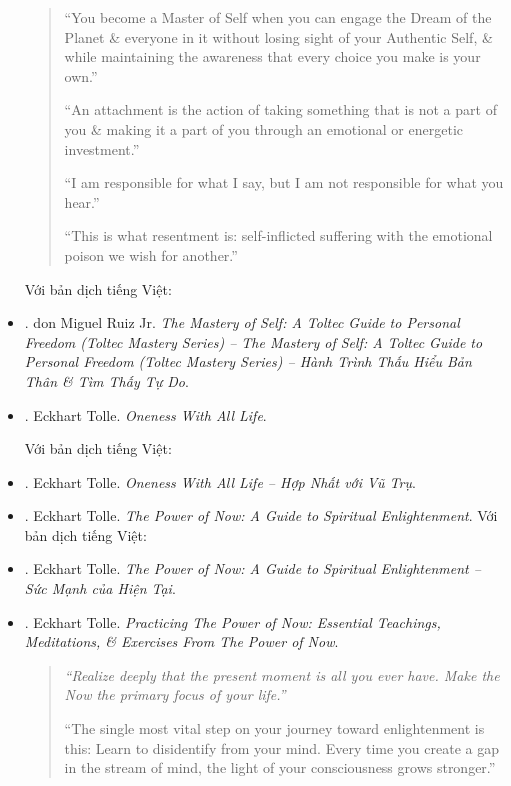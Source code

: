 \documentclass[12pt]{article}
\begin{document}
\begin{itemize}
\begin{quotation}
		``You become a Master of Self when you can engage the Dream of the Planet \& everyone in it without losing sight of your Authentic Self, \& while maintaining the awareness that every choice you make is your own.''
		
		``An attachment is the action of taking something that is not a part of you \& making it a part of you through an emotional or energetic investment.''
		
		``I am responsible for what I say, but I am not responsible for what you hear.''
		
		``This is what resentment is: self-inflicted suffering with the emotional poison we wish for another.''
	\end{quotation}
	Với bản dịch tiếng Việt:
	\item \cite{Ruiz_mastery_self}. {\sc don Miguel Ruiz Jr.} {\it The Mastery of Self: A Toltec Guide to Personal Freedom (Toltec Mastery Series) -- The Mastery of Self: A Toltec Guide to Personal Freedom (Toltec Mastery Series) -- Hành Trình Thấu Hiểu Bản Thân \& Tìm Thấy Tự Do}.
	\item \cite{Tolle_oneness}. {\sc Eckhart Tolle}. {\it Oneness With All Life}.
	
	Với bản dịch tiếng Việt:
	\item \cite{Tolle_oneness_VN}. {\sc Eckhart Tolle}. {\it Oneness With All Life -- Hợp Nhất với Vũ Trụ}.
	\item \cite{Tolle_now}. {\sc Eckhart Tolle}. {\it The Power of Now: A Guide to Spiritual Enlightenment}. Với bản dịch tiếng Việt:
	\item \cite{Tolle_now_VN}. {\sc Eckhart Tolle}. {\it The Power of Now: A Guide to Spiritual Enlightenment -- Sức Mạnh của Hiện Tại}.
	\item \cite{Tolle_practice_now}. {\sc Eckhart Tolle}. {\it Practicing The Power of Now: Essential Teachings, Meditations, \& Exercises From The Power of Now}.
	\begin{quotation}\it
		``Realize deeply that the present moment is all you ever have. Make the Now the primary focus of your life.''
		
		``The single most vital step on your journey toward enlightenment is this: Learn to disidentify from your mind. Every time you create a gap in the stream of mind, the light of your consciousness grows stronger.''
		

\end{quotation}
\end{itemize}
\end{document}
